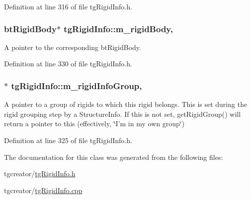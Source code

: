 Definition at line 316 of file tg\-Rigid\-Info.\-h.

\hypertarget{classtg_rigid_info_ab6e331d7cb329704f24a069ff3c309f3}{
\subsubsection[{m\-\_\-rigid\-Body}]{\setlength{\rightskip}{0pt plus 5cm}bt\-Rigid\-Body$\ast$ tg\-Rigid\-Info\-::m\-\_\-rigid\-Body\hspace{0.3cm}{\ttfamily [mutable]}, {\ttfamily [protected]}}}\label{classtg_rigid_info_ab6e331d7cb329704f24a069ff3c309f3}
A pointer to the corresponding bt\-Rigid\-Body. 

Definition at line 330 of file tg\-Rigid\-Info.\-h.

\hypertarget{classtg_rigid_info_a410205a69125205c4d63883e1fcfb0ae}{
\subsubsection[{m\-\_\-rigid\-Info\-Group}]{$\ast$ tg\-Rigid\-Info\-::m\-\_\-rigid\-Info\-Group\hspace{0.3cm}{\ttfamily [mutable]}, {\ttfamily [protected]}}}\label{classtg_rigid_info_a410205a69125205c4d63883e1fcfb0ae}
A pointer to a group of rigids to which this rigid belongs. This is set during the rigid grouping step by a Structure\-Info. If this is not set, get\-Rigid\-Group() will return a pointer to this (effectively, \char`\"{}\-I'm in my own group\char`\"{}) 

Definition at line 325 of file tg\-Rigid\-Info.\-h.



The documentation for this class was generated from the following files\-:\begin{DoxyCompactItemize}
\item 
tgcreator/\hyperlink{tg_rigid_info_8h}{tg\-Rigid\-Info.\-h}\item 
tgcreator/\hyperlink{tg_rigid_info_8cpp}{tg\-Rigid\-Info.\-cpp}\end{DoxyCompactItemize}
